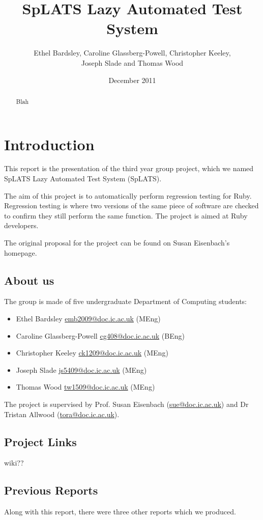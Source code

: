 \documentclass{report}
\makeatletter
\newcommand{\mail}[1]{\href{mailto:#1@doc.ic.ac.uk}{#1@doc.ic.ac.uk}}
\makeatother
\begin{document}
\title{SpLATS Lazy Automated Test System}
\author{Ethel Bardsley, Caroline Glassberg-Powell, Christopher Keeley,\\ Joseph Slade and Thomas Wood}
\date{December 2011}
\maketitle

\begin{abstract}
Blah
\end{abstract}

\chapter{Introduction}
This report is the presentation of the third year group project, which we named SpLATS Lazy Automated Test System (SpLATS).

The aim of this project is to automatically perform regression testing for Ruby. Regression testing is where two versions of the same piece of software are checked to confirm they still perform the same function. The project is aimed at Ruby developers.

The original proposal for the project can be found on Susan Eisenbach's homepage.

\section{About us}
The group is made of five undergraduate Department of Computing students:
\begin{itemize}
\item{Ethel Bardsley \mail{emb2009} (MEng)}
\item{Caroline Glassberg-Powell \mail{cg408} (BEng)}
\item{Christopher Keeley \mail{ck1209} (MEng)}
\item{Joseph Slade \mail{js5409} (MEng)}
\item{Thomas Wood \mail{tw1509} (MEng)}
\end{itemize}

The project is supervised by Prof. Susan Eisenbach (\mail{sue}) and Dr Tristan Allwood (\mail{tora}).

\section{Project Links}
wiki??

\section{Previous Reports}
Along with this report, there were three other reports which we produced.
\end{document}

